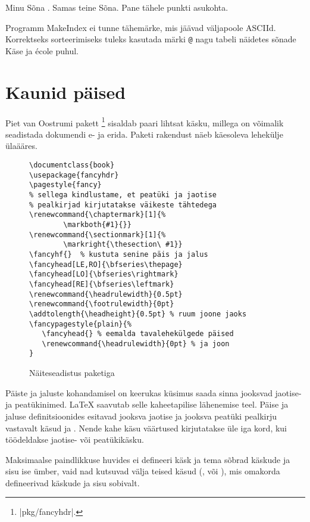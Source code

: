 \begin{example}
Minu Sõna . Samas
teine Sõna. Pane
tähele punkti asukohta.
\end{example}

Programm MakeIndex ei tunne tähemärke, mis jäävad väljapoole ASCIId.
Korrektseks sorteerimiseks tuleks kasutada märki \verb|@| nagu tabeli
näidetes sõnade K\"ase ja \'ecole puhul.

\section{Kaunid päised}
\label{sec:fancy}

Piet van Oostrumi pakett
\footnote{\CTAN|pkg/fancyhdr|.} sisaldab paari lihtsat
käsku, millega on võimalik seadistada dokumendi e- ja
erida. Paketi rakendust näeb käesoleva lehekülje ülaääres.

\begin{figure}[!t]
\begin{lined}{\textwidth}
\begin{verbatim}
\documentclass{book}
\usepackage{fancyhdr}
\pagestyle{fancy}
% sellega kindlustame, et peatüki ja jaotise
% pealkirjad kirjutatakse väikeste tähtedega
\renewcommand{\chaptermark}[1]{%
        \markboth{#1}{}}
\renewcommand{\sectionmark}[1]{%
        \markright{\thesection\ #1}}
\fancyhf{}  % kustuta senine päis ja jalus
\fancyhead[LE,RO]{\bfseries\thepage}
\fancyhead[LO]{\bfseries\rightmark}
\fancyhead[RE]{\bfseries\leftmark}
\renewcommand{\headrulewidth}{0.5pt}
\renewcommand{\footrulewidth}{0pt}
\addtolength{\headheight}{0.5pt} % ruum joone jaoks
\fancypagestyle{plain}{%
   \fancyhead{} % eemalda tavalehekülgede päised
   \renewcommand{\headrulewidth}{0pt} % ja joon
}
\end{verbatim}
\end{lined}
\caption{Näiteseadistus paketiga } \label{fancyhdr}
\end{figure}

Päiste ja jaluste kohandamisel on keerukas küsimus saada sinna jooksvad
jaotise- ja peatükinimed. \LaTeX{} saavutab selle kaheetapilise
lähenemise teel. Päise ja jaluse definitsioonides esitavad jooksva
jaotise ja jooksva peatüki pealkirju vastavalt käsud  ja
. Nende kahe käsu väärtused kirjutatakse üle iga kord, kui
töödeldakse jaotise- või peatükikäsku.

Maksimaalse paindlikkuse huvides ei defineeri käsk  ja
tema sõbrad käskude  ja  sisu ise ümber, vaid
nad kutsuvad välja teised käsud (,  või
), mis omakorda defineerivad käskude
 ja  sisu sobivalt.

